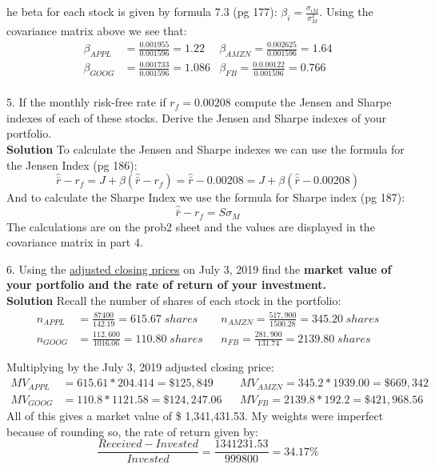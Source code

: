 \documentclass[12pt]{article}
\newenvironment{problem}[3][Problem]{\begin{trivlist}
\item[\hskip \labelsep {\bfseries #1}\hskip \labelsep {\bfseries #2.}]}{\end{trivlist}}
\newcommand{\barr}{\bar{r}}
\begin{document}
\begin{problem}{2 (50 Points)}
The beta for each stock is given by formula 7.3 (pg 177): $\beta_i = \frac{\sigma_{iM}}{\sigma^2_M}$. Using the covariance matrix above we see that: 
\begin{align*}
\beta_{APPL} &= \frac{0.001955}{0.001596} = 1.22 &  \beta_{AMZN} = \frac{0.002625}{0.001596} = 1.64 \\
\beta_{GOOG} &= \frac{0.001733}{0.001596} = 1.086 &  \beta_{FB} = \frac{0.0.00122}{0.001596} =  0.766\\
\end{align*}

\newpage
5. If the monthly risk-free rate if $r_f = 0.00208$ compute the Jensen and Sharpe indexes of each of these stocks. Derive the Jensen and Sharpe indexes of your portfolio. \\
\textbf{Solution} To calculate the Jensen and Sharpe indexes we can use the formula for the Jensen Index (pg 186): $$\hat{\barr } - r_f = J + \beta (\hat{\barr } - r_f) = \hat{\barr } - 0.00208 = J + \beta (\hat{\barr } - 0.00208)$$
And to calculate the Sharpe Index we use the formula for Sharpe index (pg 187):
$$\hat{\barr } - r_f = S\sigma_M $$
The calculations are on the prob2 sheet and the values are displayed in the covariance matrix in part 4. 

\newpage
6. Using the \underline{adjusted closing prices} on 
July 3, 2019 find the\textbf{ market value of your portfolio and the rate of return of your investment.}\\
\textbf{Solution} Recall the number of shares of each stock in the portfolio:
\begin{align*} 
n_{APPL} &= \frac{87400}{142.19} = 615.67 \; shares &&  n_{AMZN} = \frac{517,900}{1500.28} =345.20 \; shares \\ 
n_{GOOG}& = \frac{112,600}{1016.06} = 110.80 \; shares &&  n_{FB} = \frac{281,900}{131.74} = 2139.80 \;  shares 
\end{align*}

Multiplying by the July 3, 2019 adjusted closing price: 
\begin{align*}
MV_{APPL} &=615.61*204.414 = \$ 125,849  && MV_{AMZN} = 345.2*1939.00 = \$ 669,342 \\
MV_{GOOG} &= 110.8*1121.58 = \$ 124,247.06 && MV_{FB} = 2139.8*192.2 = \$ 421,968.56 
\end{align*}
All of this gives a market value of \$ 1,341,431.53. My weights were imperfect because of rounding so, the rate of return given by: 
$$ \frac{Received - Invested}{Invested} = \frac{1341231.53}{999800} = 34.17 \% $$

 \end{problem}
 
\end{document}
